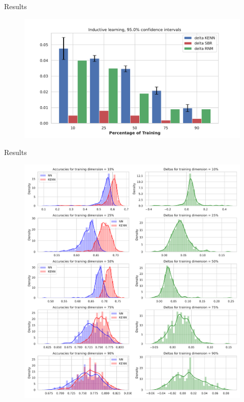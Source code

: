 \documentclass{beamer}
\begin{document}


\begin{frame}{Results}
	\begin{figure}
		\centering
		\includegraphics[width=0.9\linewidth]{images/deltas_inductive.pdf}
	\end{figure}
\end{frame}

\begin{frame}{Results}
	\begin{figure}
		\includegraphics[width=0.6\linewidth]{images/histograms_inductive.pdf}
	\end{figure}
\end{frame}
\end{document}
